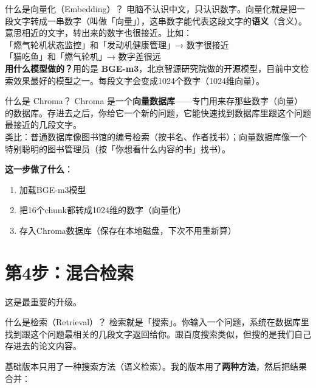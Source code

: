 \documentclass[12pt,a4paper,landscape]{article}
\begin{document}
\begin{termbox}{什么是向量化（Embedding）？}
电脑不认识中文，只认识数字。向量化就是把一段文字转成一串数字（叫做「向量」），这串数字能代表这段文字的\textbf{语义}（含义）。\\[4pt]
意思相近的文字，转出来的数字也很接近。比如：\\
\quad「燃气轮机状态监控」和「发动机健康管理」→ 数字很接近\\
\quad「猫吃鱼」和「燃气轮机」→ 数字差很远\\[4pt]
\textbf{用什么模型做的？}用的是 \textbf{BGE-m3}，北京智源研究院做的开源模型，目前中文检索效果最好的模型之一。每段文字会变成1024个数字（1024维向量）。
\end{termbox}

\begin{termbox}{什么是 Chroma？}
Chroma 是一个\textbf{向量数据库}——专门用来存那些数字（向量）的数据库。存进去之后，你给它一个新的问题，它能快速找到数据库里跟这个问题最接近的几段文字。\\[2pt]
类比：普通数据库像图书馆的编号检索（按书名、作者找书）；向量数据库像一个特别聪明的图书管理员（按「你想看什么内容的书」找书）。
\end{termbox}

\textbf{这一步做了什么}：
\begin{enumerate}[nosep]
  \item 加载BGE-m3模型
  \item 把16个chunk都转成1024维的数字（向量化）
  \item 存入Chroma数据库（保存在本地磁盘，下次不用重新算）
\end{enumerate}

\section{第4步：混合检索}

这是最重要的升级。

\begin{termbox}{什么是检索（Retrieval）？}
检索就是「搜索」。你输入一个问题，系统在数据库里找到跟这个问题最相关的几段文字返回给你。跟百度搜索类似，但搜的是我们自己存进去的论文内容。
\end{termbox}

基础版本只用了一种搜索方法（语义检索）。我的版本用了\textbf{两种方法}，然后把结果合并：
\end{document}

